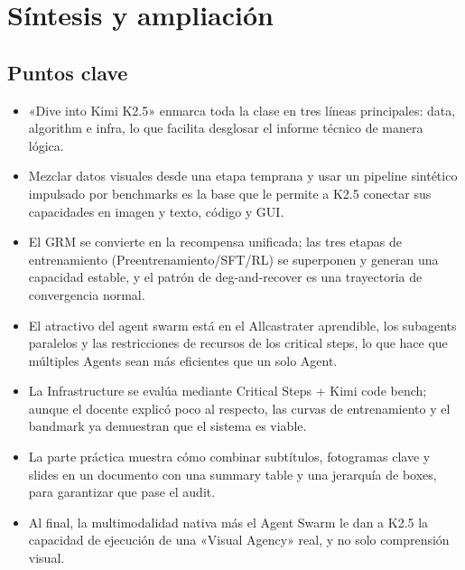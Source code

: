\section{Síntesis y ampliación}

\subsection{Puntos clave}
\begin{itemize}
    \item «Dive into Kimi K2.5» enmarca toda la clase en tres líneas principales: data, algorithm e infra, lo que facilita desglosar el informe técnico de manera lógica.
    \item Mezclar datos visuales desde una etapa temprana y usar un pipeline sintético impulsado por benchmarks es la base que le permite a K2.5 conectar sus capacidades en imagen y texto, código y GUI.
    \item El GRM se convierte en la recompensa unificada; las tres etapas de entrenamiento (Preentrenamiento/SFT/RL) se superponen y generan una capacidad estable, y el patrón de deg-and-recover es una trayectoria de convergencia normal.
    \item El atractivo del agent swarm está en el Allcastrater aprendible, los subagents paralelos y las restricciones de recursos de los critical steps, lo que hace que múltiples Agents sean más eficientes que un solo Agent.
    \item La Infrastructure se evalúa mediante Critical Steps + Kimi code bench; aunque el docente explicó poco al respecto, las curvas de entrenamiento y el bandmark ya demuestran que el sistema es viable.
    \item La parte práctica muestra cómo combinar subtítulos, fotogramas clave y slides en un documento con una summary table y una jerarquía de boxes, para garantizar que pase el audit.
    \item Al final, la multimodalidad nativa más el Agent Swarm le dan a K2.5 la capacidad de ejecución de una «Visual Agency» real, y no solo comprensión visual.
\end{itemize}

